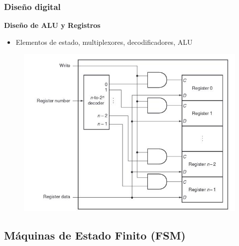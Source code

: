 \documentclass[aspectratio=169,compress]{beamer}
\begin{document}
\begin{footnotesize}
\begin{frame}[fragile]
\frametitle{Diseño digital}
\begin{center}\textbf{Diseño de ALU y Registros}\end{center}
\begin{itemize}
\item Elementos de estado, multiplexores, decodificadores, ALU
\end{itemize}
\begin{figure}
\includegraphics[scale=0.4]{images/escribir-registro.jpg} 
\end{figure}
\end{frame}


\subsection{Máquinas de Estado Finito (FSM)}



\end{footnotesize}
\end{document}
